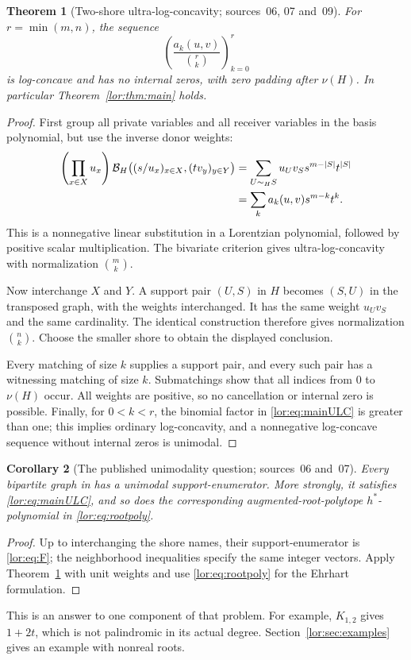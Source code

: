 \documentclass[11pt]{article}
\numberwithin{equation}{section}
\newtheorem{theorem}{Theorem}[section]
\newtheorem{corollary}[theorem]{Corollary}
\theoremstyle{definition}
\begin{document}
\begin{theorem}[Two-shore ultra-log-concavity; sources~06, 07 and~09]\label{lor:thm:weightedULC}
For $r=\min(m,n)$, the sequence
\[
 \left(\frac{a_k(u,v)}{\binom r k}\right)_{k=0}^{r}
\]
is log-concave and has no internal zeros, with zero padding after
$\nu(H)$. In particular Theorem~\ref{lor:thm:main} holds.
\end{theorem}
\begin{proof}
First group all private variables and all receiver variables in the
basis polynomial, but use the inverse donor weights:
\begin{align}
 \left(\prod_{x\in X}u_x\right)
 \mathcal B_H\bigl((s/u_x)_{x\in X},(t v_y)_{y\in Y}\bigr)
 &=\sum_{U\sim_H S}u_Uv_Ss^{m-|S|}t^{|S|}\notag\\
 &=\sum_k a_k(u,v)s^{m-k}t^k.
 \label{lor:eq:weightedhom}
\end{align}
This is a nonnegative linear substitution in a Lorentzian polynomial,
followed by positive scalar multiplication. The bivariate criterion gives
ultra-log-concavity with normalization $\binom m k$.

Now interchange $X$ and $Y$. A support pair $(U,S)$ in $H$ becomes $(S,U)$
in the transposed graph, with the weights interchanged. It has the same
weight $u_Uv_S$ and the same cardinality. The identical construction
therefore gives normalization $\binom n k$. Choose the smaller shore to
obtain the displayed conclusion.

Every matching of size $k$ supplies a support pair, and every such pair
has a witnessing matching of size $k$. Submatchings show that all indices
from $0$ to $\nu(H)$ occur. All weights are positive, so no cancellation
or internal zero is possible. Finally, for $0<k<r$, the binomial factor in
\eqref{lor:eq:mainULC} is greater than one; this implies ordinary log-concavity,
and a nonnegative log-concave sequence without internal zeros is unimodal.
\end{proof}

\begin{corollary}[The published unimodality question; sources~06 and~07]\label{lor:cor:DHLTW}
Every bipartite graph in \cite[Problem~5.3]{DHLTW} has a unimodal
support-enumerator. More strongly, it satisfies \eqref{lor:eq:mainULC}, and so
does the corresponding augmented-root-polytope $h^*$-polynomial in
\eqref{lor:eq:rootpoly}.
\end{corollary}
\begin{proof}
Up to interchanging the shore names, their support-enumerator is
\eqref{lor:eq:F}; the neighborhood inequalities specify the same integer
vectors. Apply Theorem~\ref{lor:thm:weightedULC} with unit weights and use
\eqref{lor:eq:rootpoly} for the Ehrhart formulation.
\end{proof}
This is an answer to one component of that problem. For example,
$K_{1,2}$ gives $1+2t$, which is not palindromic in its actual degree.
Section~\ref{lor:sec:examples} gives an example with nonreal roots.
\end{document}

